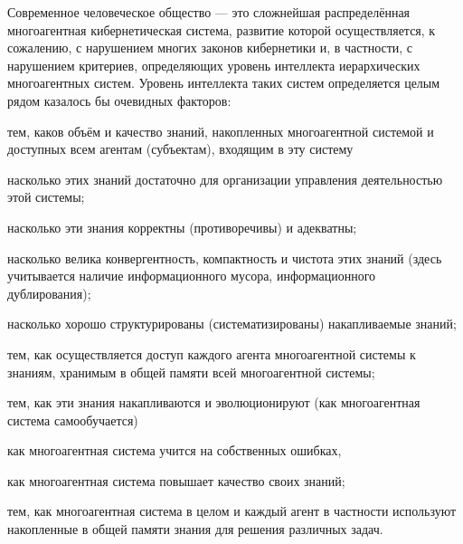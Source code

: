 Современное человеческое общество --- это сложнейшая распределённая многоагентная кибернетическая система, развитие которой осуществляется, к сожалению, с нарушением многих законов кибернетики и, в частности, с нарушением критериев, определяющих уровень интеллекта иерархических многоагентных систем. Уровень интеллекта таких систем определяется целым рядом казалось бы очевидных факторов:
\begin{textitemize}
	\item тем, каков объём и качество знаний, накопленных многоагентной системой и доступных всем агентам (субъектам), входящим в эту систему
	\begin{textitemize}
		\item насколько этих знаний достаточно для организации управления деятельностью этой системы;
		\item насколько эти знания корректны (противоречивы) и адекватны;
		\item насколько велика конвергентность, компактность и чистота этих знаний (здесь учитывается наличие информационного мусора, информационного дублирования);
		\item насколько хорошо структурированы (систематизированы) накапливаемые знаний;
	\end{textitemize}
	\item тем, как осуществляется доступ каждого агента многоагентной системы к знаниям, хранимым в общей памяти всей многоагентной системы;
	\item тем, как эти знания накапливаются и эволюционируют (как многоагентная система самообучается)
	\begin{textitemize}
		\item как многоагентная система учится на собственных ошибках,
		\item как многоагентная система повышает качество своих знаний;
	\end{textitemize}
	\item тем, как многоагентная система в целом и каждый агент в частности используют накопленные в общей памяти знания для решения различных задач.
\end{textitemize}

